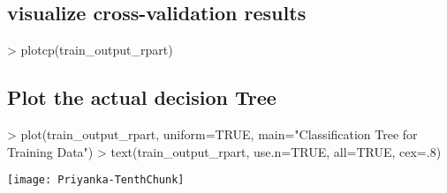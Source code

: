 \documentclass{article}
\begin{document}
\subsection*{visualize cross-validation results}
\begin{Schunk}
\begin{Sinput}
> plotcp(train_output_rpart) 
\end{Sinput}
\end{Schunk}
\subsection*{Plot the actual decision Tree}
\begin{Schunk}
\begin{Sinput}
> plot(train_output_rpart, uniform=TRUE, main="Classification Tree for Training Data")
> text(train_output_rpart, use.n=TRUE, all=TRUE, cex=.8)
\end{Sinput}
\end{Schunk}
\texttt{[image: Priyanka-TenthChunk]}
\end{document}
